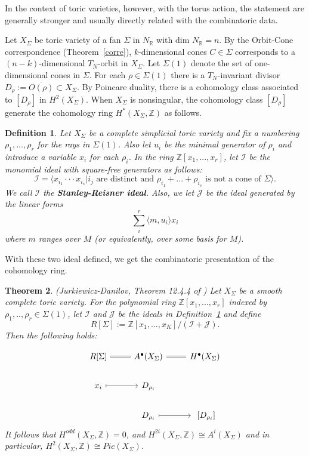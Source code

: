 \documentclass[11pt]{article}
\newtheorem{thm}{Theorem}[section]
\newtheorem{dfn}[thm]{Definition}
\newcommand{\reals}{\mathbb R}
\newcommand{\intg}{\mathbb Z}
\begin{document}
In the context of toric varieties, however, with the torus action, the statement are generally stronger and usually directly related with the combinatoric data.

Let $X_\Sigma$ be toric variety of a fan $\Sigma$ in $N_\reals$ with $\text{dim } N_\reals=n$. By the Orbit-Cone correspondence (Theorem~\ref{corre}), $k$-dimensional cones $C\in \Sigma$ corresponds to a $(n-k)$-dimensional $T_N$-orbit in $X_\Sigma$. Let $\Sigma(1)$ denote the set of one-dimensional cones in $\Sigma$. For each $\rho\in \Sigma(1)$ there is a $T_N$-invariant divisor $D_{\rho}:=\overline{O(\rho)}\subset X_\Sigma$. By Poincare duality, there is a cohomology class associated to $[D_\rho]$ in $H^2(X_\Sigma)$. When $X_\Sigma$ is nonsingular, the cohomology class $[D_\rho]$ generate the cohomology ring $H^*(X_\Sigma, \mathbb{Z})$ as follows.

\begin{dfn}\label{ideals}
Let $X_\Sigma$ be a complete simplicial toric variety and fix a numbering $\rho_1,...,\rho_r$ for the rays in $\Sigma(1)$. Also let $u_i$ be the minimal generator of $\rho_i$ and introduce a variable $x_i$ for each $\rho_i$. In the ring $\mathbb{Z}[x_1,...,x_r]$, let $\mathcal{I}$ be the monomial ideal with square-free generators as follows:
\begin{equation*}
\mathcal{I} = \langle x_{i_1}\cdot\cdot\cdot x_{i_s} | i_j \text{ are distinct and } \rho_{i_1}+...+\rho_{i_s} \text{ is not a cone of } \Sigma\rangle.
\end{equation*}
We call $\mathcal{I}$ the \textbf{Stanley-Reisner ideal}. Also, we let $\mathcal{J}$ be the ideal generated by the linear forms
\begin{equation*}
\sum_{i}^r\langle m, u_i \rangle x_i 
\end{equation*}
where $m$ ranges over $M$ (or equivalently, over some basis for $M$).
\end{dfn}
With these two ideal defined, we get the combinatoric presentation of the cohomology ring.
\begin{thm}
(Jurkiewicz-Danilov, Theorem 12.4.4 of \cite{cox2009toric}) Let $X_\Sigma$ be a smooth complete toric variety. For the polynomial ring $\intg[x_1,...,x_r]$ indexed by $\rho_1,..,\rho_r\in \Sigma(1)$, let $\mathcal{I}$ and $\mathcal{J}$ be the ideals in Definition~\ref{ideals} and define
\begin{equation*}
R[\Sigma]:=\mathbb{Z}[x_1,...,x_K]/{(\mathcal{I}+\mathcal{J})}.
\end{equation*}
Then the following holds:

	\[ \begin{tikzcd}
	R[\Sigma] \arrow[r,equal] & A^\bullet(X_\Sigma) \arrow[r,equal] & H^\bullet(X_\Sigma)\\%
	x_i \arrow[r,mapsto]		& D_{\rho_i} & \\
	\ & D_{\rho_i}\arrow[r,mapsto] & \ [D_{\rho_i}]
	\end{tikzcd}\]	
It follows that $H^{odd}(X_\Sigma,\mathbb{Z})=0$, and $H^{2i}(X_\Sigma,\intg)\cong A^i(X_\Sigma)$ and in particular, $H^2(X_\Sigma,\intg)\cong Pic(X_\Sigma)$.
\end{thm}
\end{document}
